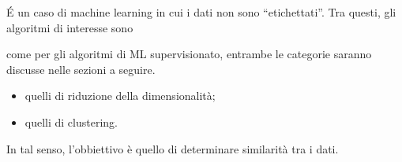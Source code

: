 \documentclass{subfiles}
\begin{document}
\'E un caso di machine learning in cui i dati non sono ``etichettati''.
Tra questi, gli algoritmi di interesse sono
\begin{MarginNote}
    come per gli algoritmi di ML supervisionato, entrambe le categorie saranno discusse nelle sezioni a seguire.
\end{MarginNote}
\begin{itemize}
    \item quelli di riduzione della dimensionalità;
    \item quelli di clustering.
\end{itemize}
In tal senso, l'obbiettivo è quello di determinare similarità tra i dati.
\end{document}
